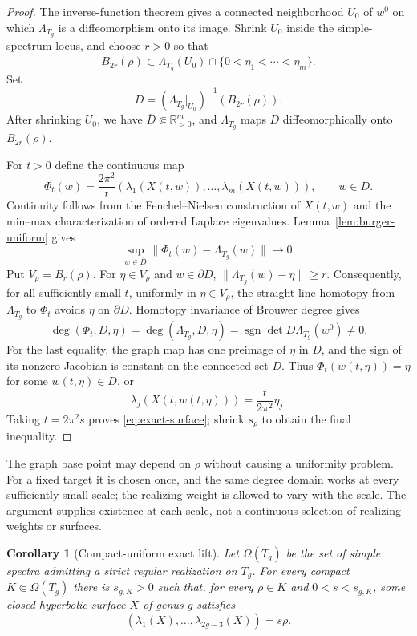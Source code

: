 \documentclass[11pt,reqno]{amsart}
\newtheorem{corollary}[theorem]{Corollary}
\theoremstyle{definition}
\theoremstyle{remark}
\newcommand{\R}{\mathbb R}
\begin{document}
\begin{proof}
The inverse-function theorem gives a connected neighborhood $U_0$ of $w^0$
on which $\Lambda_{T_g}$ is a diffeomorphism onto its image.  Shrink $U_0$
inside the simple-spectrum locus, and choose $r>0$ so that
\[
 \overline{B_{2r}(\rho)}\subset
 \Lambda_{T_g}(U_0)\cap\{0<\eta_1<\cdots<\eta_m\}.
\]
Set
\[
 D=(\Lambda_{T_g}|_{U_0})^{-1}(B_{2r}(\rho)).
\]
After shrinking $U_0$, we have
$\overline D\Subset\R_{>0}^{m}$, and $\Lambda_{T_g}$ maps $D$
diffeomorphically onto $B_{2r}(\rho)$.

For $t>0$ define the continuous map
\[
 \Phi_t(w)=\frac{2\pi^2}{t}
 (\lambda_1(X(t,w)),\ldots,\lambda_m(X(t,w))),
 \qquad w\in\overline D.
\]
Continuity follows from the Fenchel--Nielsen construction of $X(t,w)$ and
the min--max characterization of ordered Laplace eigenvalues.
Lemma~\ref{lem:burger-uniform} gives
\begin{equation}\label{eq:uniform-chart-convergence}
 \sup_{w\in\overline D}\|\Phi_t(w)-\Lambda_{T_g}(w)\|\longrightarrow0.
\end{equation}
Put $V_\rho=B_r(\rho)$.  For $\eta\in V_\rho$ and $w\in\partial D$,
$\|\Lambda_{T_g}(w)-\eta\|\ge r$.  Consequently, for all sufficiently
small $t$, uniformly in $\eta\in V_\rho$, the straight-line homotopy from
$\Lambda_{T_g}$ to $\Phi_t$ avoids $\eta$ on $\partial D$.  Homotopy
invariance of Brouwer degree gives
\[
 \deg(\Phi_t,D,\eta)
 =\deg(\Lambda_{T_g},D,\eta)
 =\operatorname{sgn}\det D\Lambda_{T_g}(w^0)\ne0.
\]
For the last equality, the graph map has one preimage of $\eta$ in $D$, and
the sign of its nonzero Jacobian is constant on the connected set $D$.
Thus $\Phi_t(w(t,\eta))=\eta$ for some $w(t,\eta)\in D$, or
\[
 \lambda_j(X(t,w(t,\eta)))=\frac{t}{2\pi^2}\eta_j.
\]
Taking $t=2\pi^2s$ proves \eqref{eq:exact-surface}; shrink $s_\rho$ to
obtain the final inequality.
\end{proof}

The graph base point may depend on $\rho$ without causing a uniformity
problem.  For a fixed target it is chosen once, and the same degree domain
works at every sufficiently small scale; the realizing weight is allowed to
vary with the scale.  The argument supplies existence at each scale, not a
continuous selection of realizing weights or surfaces.

\begin{corollary}[Compact-uniform exact lift]\label{cor:compact-lift}
Let $\Omega(T_g)$ be the set of simple spectra admitting a strict regular
realization on $T_g$.  For every compact $K\Subset\Omega(T_g)$ there is
$s_{g,K}>0$ such that, for every $\rho\in K$ and $0<s<s_{g,K}$, some closed
hyperbolic surface $X$ of genus $g$ satisfies
\[
 (\lambda_1(X),\ldots,\lambda_{2g-3}(X))=s\rho.
\]
\end{corollary}
\end{document}

